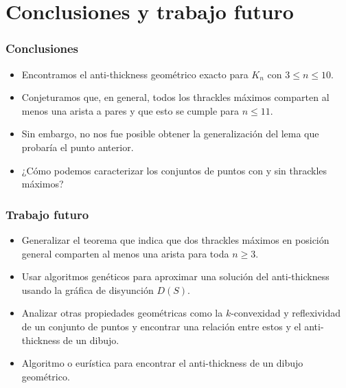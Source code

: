 \section{Conclusiones y trabajo futuro}
\begin{frame}
\frametitle{Conclusiones}
\begin{itemize}
	\item Encontramos el anti-thickness geométrico exacto para $K_n$ con $3 \leq n \leq 10$.
	\item Conjeturamos que, en general, todos los thrackles máximos comparten al menos una arista a pares y que esto se cumple para $n \leq 11$.
	\item Sin embargo, no nos fue posible obtener la generalización del lema que probaría el punto anterior.
	\item ¿Cómo podemos caracterizar los conjuntos de puntos con y sin thrackles máximos?
\end{itemize}
\end{frame}

\begin{frame}
\frametitle{Trabajo futuro}
\begin{itemize}
	\item Generalizar el teorema que indica que dos thrackles máximos en posición general comparten al menos una arista para toda $n \geq 3$.
	\item Usar algoritmos genéticos para aproximar una solución del anti-thickness usando la gráfica de disyunción $D(S)$.
	\item Analizar otras propiedades geométricas como la $k$-convexidad y reflexividad de un conjunto de puntos y encontrar una relación entre estos y el anti-thickness de un dibujo.
	\item Algoritmo o eurística para encontrar el anti-thickness de un dibujo geométrico.
\end{itemize}
\end{frame}